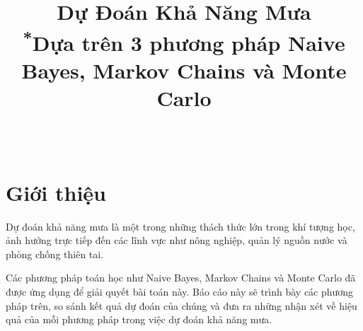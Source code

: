 \documentclass[conference]{IEEEtran}
\begin{document}
\title{Dự Đoán Khả Năng Mưa\\
{\footnotesize \textsuperscript{*}Dựa trên 3 phương pháp Naive Bayes, Markov Chains và Monte Carlo}
}
\author{
    \and
    \\
    \hfill
    \and
}
\maketitle
\section{Giới thiệu}
Dự đoán khả năng mưa là một trong những thách thức lớn trong khí tượng học, ảnh hưởng trực tiếp đến các lĩnh vực như nông nghiệp, quản lý nguồn nước và phòng chống thiên tai.

\indent Các phương pháp toán học như Naive Bayes, Markov Chains và Monte Carlo đã được ứng dụng để giải quyết bài toán này. Báo cáo này sẽ trình bày các phương pháp trên, so sánh kết quả dự đoán của chúng và đưa ra những nhận xét về hiệu quả của mỗi phương pháp trong việc dự đoán khả năng mưa.
\end{document}
